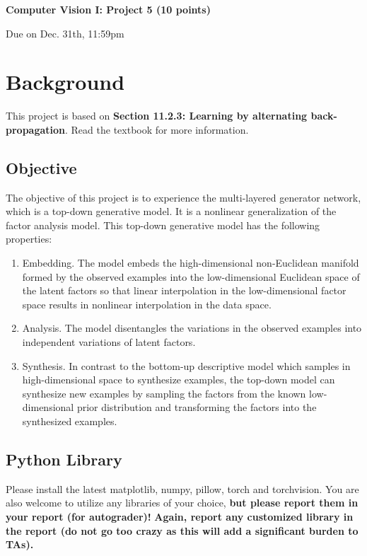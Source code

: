 \documentclass[11pt]{article}
\begin{document}
\begin{center}
{\bf\Large Computer Vision I: Project 5 (10 points)}

\vspace{1em}
Due on Dec. 31th, 11:59pm
\end{center}

\section{Background} 

This project is based on \textbf{Section 11.2.3: Learning by alternating back-propagation}. Read the textbook for more information.

\subsection{Objective}
The objective of this project is to experience the multi-layered generator network, which is a top-down generative model. It is a nonlinear generalization of the factor analysis model. This top-down generative model has the following properties:
\begin{enumerate}[leftmargin=*,nolistsep]
    \item Embedding. The model embeds the high-dimensional non-Euclidean manifold formed by the observed examples into the low-dimensional Euclidean space of the latent factors so that linear interpolation in the low-dimensional factor space results in nonlinear interpolation in the data space.
    \item Analysis. The model disentangles the variations in the observed examples into independent variations of latent factors.
    \item Synthesis. In contrast to the bottom-up descriptive model which samples in high-dimensional space to synthesize examples, the top-down model can synthesize new examples by sampling the factors from the known low-dimensional prior distribution and transforming the factors into the synthesized examples.
\end{enumerate}

\subsection{Python Library}

Please install the latest matplotlib, numpy, pillow, torch and torchvision. You are also welcome to utilize any libraries of your choice, \textbf{but please report them in your report (for autograder)!}
\color{red}
\textbf{Again, report any customized library in the report (do not go too crazy as this will add a significant burden to TAs).}
\color{black}
\end{document}
